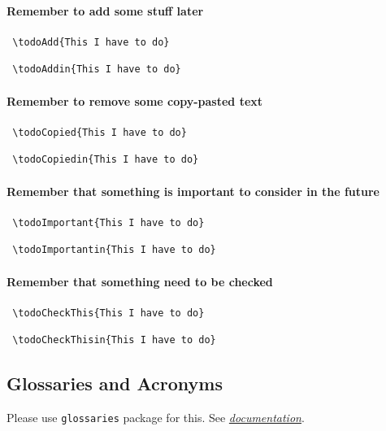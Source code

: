 \paragraph{Remember to add some stuff later}
\begin{verbatim}
 \todoAdd{This I have to do}
\end{verbatim}
\begin{verbatim}
 \todoAddin{This I have to do}
\end{verbatim}

\paragraph{Remember to remove some copy-pasted text}
\begin{verbatim}
 \todoCopied{This I have to do}
\end{verbatim}
\begin{verbatim}
 \todoCopiedin{This I have to do}
\end{verbatim}

\paragraph{Remember that something is important to consider in the future}
\begin{verbatim}
 \todoImportant{This I have to do}
\end{verbatim}
\begin{verbatim}
 \todoImportantin{This I have to do}
\end{verbatim}

\paragraph{Remember that something need to be checked}
\begin{verbatim}
 \todoCheckThis{This I have to do}
\end{verbatim}
\begin{verbatim}
 \todoCheckThisin{This I have to do}
\end{verbatim}


\subsection{Glossaries and Acronyms}
Please use \texttt{glossaries} package for this. See \href{https://en.wikibooks.org/wiki/LaTeX/Glossary}{\textit{documentation}}.

